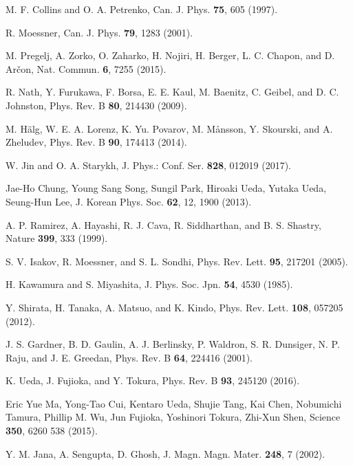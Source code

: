 \documentclass[aps,prl,reprint,amsmath,amssymb,superscriptaddress,showpacs]{revtex4-1}
\begin{document}
\begin{thebibliography}{99}

 M. F. Collins and O. A. Petrenko, Can. J. Phys. \textbf{75}, 605 (1997).

 R. Moessner, Can. J. Phys. \textbf{79}, 1283 (2001).

 M. Pregelj, A. Zorko, O. Zaharko, H. Nojiri, H. Berger, L. C. Chapon, and D. Ar\v con, Nat. Commun. \textbf{6}, 7255 (2015).

 R. Nath, Y. Furukawa, F. Borsa, E. E. Kaul, M. Baenitz, C. Geibel, and D. C. Johnston, Phys. Rev. B \textbf{80}, 214430 (2009).

 M. H\"alg, W. E. A. Lorenz, K. Yu. Povarov, M. M\aa nsson, Y. Skourski, and A. Zheludev, Phys. Rev. B \textbf{90}, 174413 (2014).

 W. Jin and O. A. Starykh, J. Phys.: Conf. Ser. \textbf{828}, 012019 (2017). 

 Jae-Ho Chung, Young Sang Song, Sungil Park, Hiroaki Ueda, Yutaka Ueda, Seung-Hun Lee, J. Korean Phys. Soc. \textbf{62}, 12, 1900 (2013). 

 A. P. Ramirez, A. Hayashi, R. J. Cava, R. Siddharthan, and B. S. Shastry, Nature \textbf{399}, 333 (1999).

 S. V. Isakov, R. Moessner, and S. L. Sondhi, Phys. Rev. Lett. \textbf{95}, 217201 (2005).

 H. Kawamura and S. Miyashita, J. Phys. Soc. Jpn. \textbf{54}, 4530 (1985).

 Y. Shirata, H. Tanaka, A. Matsuo, and K. Kindo, Phys. Rev. Lett. \textbf{108}, 057205 (2012).

 J. S. Gardner, B. D. Gaulin, A. J. Berlinsky, P. Waldron, S. R. Dunsiger, N. P. Raju, and J. E. Greedan, Phys. Rev. B \textbf{64}, 224416 (2001).

 K. Ueda, J. Fujioka, and Y. Tokura, Phys. Rev. B \textbf{93}, 245120 (2016).

 Eric Yue Ma, Yong-Tao Cui, Kentaro Ueda, Shujie Tang, Kai Chen, Nobumichi Tamura, Phillip M. Wu, Jun Fujioka, Yoshinori Tokura, Zhi-Xun Shen, Science \textbf{350}, 6260 538 (2015).

 Y. M. Jana, A. Sengupta, D. Ghosh, J. Magn. Magn. Mater. \textbf{248}, 7 (2002).


\end{thebibliography}
\end{document}
